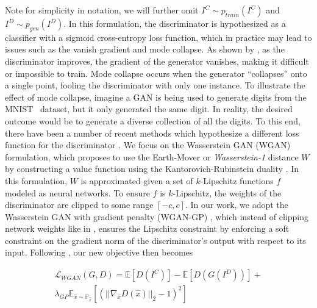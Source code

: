 Note for simplicity in notation, we will further omit $I^C \sim p_{train}(I^C)$ and $I^D \sim p_{gen}(I^D)$. In this formulation, 
the discriminator is hypothesized as a classifier with a sigmoid cross-entropy loss function, which in practice may lead
to issues  such as the vanish gradient and mode collapse. As shown by \cite{arjovsky2017towards}, as
the discriminator improves, the gradient of the generator vanishes, making it difficult or impossible to train. Mode
collapse occurs when the generator ``collapses'' onto a single point, fooling the discriminator with only one instance.
To illustrate the effect of mode collapse, imagine a GAN is being used to generate digits from the MNIST~\cite{lecun2010mnist} 
dataset, but it only generated the same digit. In reality, the desired outcome would be to generate a diverse collection of all 
the digits. To this end, there have been a number of recent methods which hypothesize a different loss function for the 
discriminator
\cite{mao2016least,arjovsky2017wasserstein,gulrajani2017improved,zhao2016energy}. We focus on the Wasserstein GAN
(WGAN) \cite{arjovsky2017wasserstein} formulation, which proposes to use the Earth-Mover or \textit{Wasserstein-1}
distance $W$ by constructing a value function using the Kantorovich-Rubinstein duality \cite{villani2008optimal}.
In this formulation, $W$ is approximated given a set of $k$-Lipschitz functions $f$ modeled as neural networks. To
ensure $f$ is $k$-Lipschitz, the weights of the discriminator are clipped to some range $[-c, c]$. In our work, we
adopt the Wasserstein GAN with gradient penalty (WGAN-GP) \cite{gulrajani2017improved}, which instead of clipping
network weights like in \cite{arjovsky2017wasserstein}, ensures the Lipschitz constraint by enforcing a soft
constraint on the gradient norm of the discriminator's output with respect to its input. Following
\cite{gulrajani2017improved}, our new objective then becomes

\begin{equation}
\begin{aligned}
   \mathcal{L}_{WGAN}(G,D) = \mathbb{E} [D(I^C)] - \mathbb{E}  [D(G(I^D))] + \\
   \lambda_{GP} \mathbb{E}_{\hat{x} \sim \mathbb{P}_{\hat{x}}} [(|| \nabla_{\hat{x}} D(\hat{x})||_2 -1)^2 ]
\end{aligned}
\end{equation}



